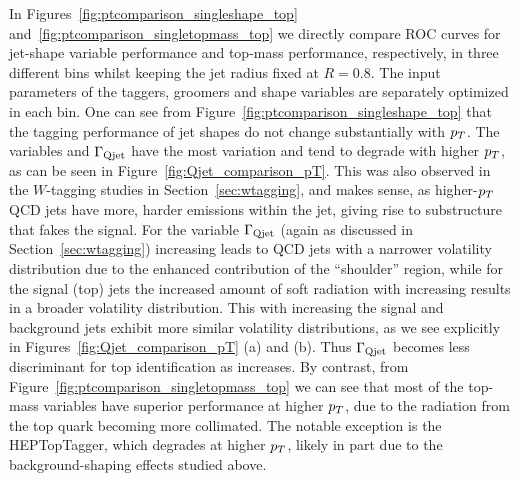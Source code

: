 In Figures~\ref{fig:ptcomparison_singleshape_top} and~\ref{fig:ptcomparison_singletopmass_top} we directly compare ROC curves for jet-shape variable performance and top-mass performance, respectively, in three different \pt bins  whilst keeping the jet radius fixed at $R=0.8$. The input parameters of the taggers, groomers and shape variables are separately optimized in each \pt bin.  One can see from Figure~\ref{fig:ptcomparison_singleshape_top} that the tagging performance of jet shapes do not change substantially with $p_T$. The variables \tauthreetwo and $\Gamma_{\rm Qjet}$ have the most variation and tend to degrade with higher $p_T$, as can be seen in Figure~\ref{fig:Qjet_comparison_pT}. This was also observed in the $W$-tagging studies in Section~\ref{sec:wtagging}, and makes sense, as higher-$p_T$ QCD jets have more, harder emissions within the jet, giving rise to substructure that fakes the signal. 
For the variable $\Gamma_{\rm Qjet}$ (again as discussed in Section~\ref{sec:wtagging}) increasing \pt leads to QCD jets with a narrower volatility distribution
due to the enhanced contribution of the ``shoulder'' region, while for the signal (top) jets the increased amount of soft radiation with increasing \pt results
in a broader volatility distribution.  This with increasing \pt the signal and background jets exhibit more similar volatility distributions, as we see explicitly
in Figures~\ref{fig:Qjet_comparison_pT} (a) and (b).  Thus $\Gamma_{\rm Qjet}$ becomes less discriminant for top identification as \pt increases.
By contrast, from Figure~\ref{fig:ptcomparison_singletopmass_top} we can see that most of the top-mass variables have superior performance at higher $p_T$, due to the radiation from the top quark becoming more collimated. The notable exception is the HEPTopTagger, which degrades at higher $p_T$, likely in part due to the background-shaping effects studied above.


